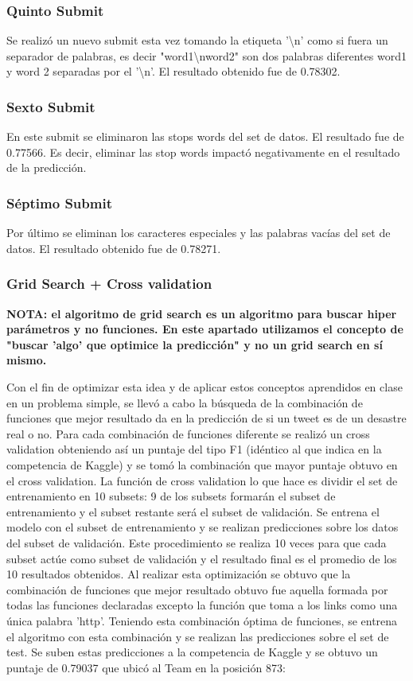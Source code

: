 \documentclass[12pt]{article}
\begin{document}
\subsubsection{Quinto Submit}
Se realizó un nuevo submit esta vez tomando la etiqueta '\textbackslash n' como si fuera un separador de palabras, es decir "word1\textbackslash nword2" son dos palabras diferentes word1 y word 2 separadas por el '\textbackslash n'.
El resultado obtenido fue de 0.78302.


\subsubsection{Sexto Submit}
En este submit se eliminaron las stops words del set de datos.
El resultado fue de 0.77566. Es decir, eliminar las stop words impactó negativamente en el resultado de la predicción.


\subsubsection{Séptimo Submit}
Por último se eliminan los caracteres especiales y las palabras vacías del set de datos.
El resultado obtenido fue de 0.78271.


\subsubsection{Grid Search + Cross validation}
\textbf{NOTA: el algoritmo de grid search es un algoritmo para buscar hiper parámetros y no funciones. En este apartado utilizamos el concepto de "buscar 'algo' que optimice la predicción" y no un grid search en sí mismo.\\}

Con el fin de optimizar esta idea y de aplicar estos conceptos aprendidos en clase en un problema simple, se llevó a cabo la búsqueda de la combinación de funciones que mejor resultado da en la predicción de si un tweet es de un desastre real o no.
Para cada combinación de funciones diferente se realizó un cross validation obteniendo así un puntaje del tipo F1 (idéntico al que indica en la competencia de Kaggle) y se tomó la combinación que mayor puntaje obtuvo en el cross validation.
La función de cross validation lo que hace es dividir el set de entrenamiento en 10 subsets: 9 de los subsets formarán el subset de entrenamiento y el subset restante será el subset de validación.
Se entrena el modelo con el subset de entrenamiento y se realizan predicciones sobre los datos del subset de validación. Este procedimiento se realiza 10 veces para que cada subset actúe como subset de validación y el resultado final es el promedio de los 10 resultados obtenidos.
Al realizar esta optimización se obtuvo que la combinación de funciones que mejor resultado obtuvo fue aquella formada por todas las funciones declaradas excepto la función que toma a los links como una única palabra 'http'.
Teniendo esta combinación óptima de funciones, se entrena el algoritmo con esta combinación y se realizan las predicciones sobre el set de test. Se suben estas predicciones a la competencia de Kaggle y se obtuvo un puntaje de 0.79037 que ubicó al Team en la posición 873:
\end{document}
